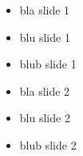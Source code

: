 \documentclass[10pt,mathserif]{beamer}
\begin{document}
    \newsavebox{\mypicture}
    \begin{frame}

        \begin{itemize}
            \item<1-> bla slide 1
            \item<2-> blu slide 1
            \item<3-> blub slide 1
        \end{itemize}

    \end{frame}

    \begin{frame}

        \begin{itemize}
            \item<1-> bla slide 2
            \item<2-> blu slide 2
            \item<3-> blub slide 2
        \end{itemize}

    \end{frame}
\end{document}
